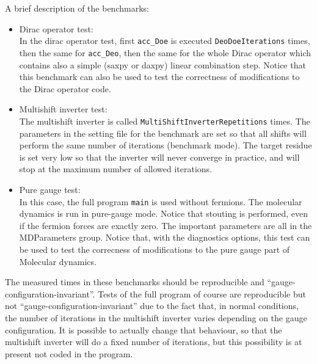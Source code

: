 A brief description of the benchmarks:
\begin{itemize}
 \item {Dirac operator test}: \\
In the dirac operator test, first \verb|acc_Doe| is executed \verb|DeoDoeIterations| 
times, then the same for \verb|acc_Deo|, then the same for the whole Dirac operator 
which contains also a simple ({\sf saxpy} or {\sf daxpy}) linear combination step.
Notice that this benchmark can also be used to test the correctness of modifications to the
Dirac operator code.
\item {Multishift inverter test}: \\
The multishift inverter is called \verb|MultiShiftInverterRepetitions| times.
The parameters in the setting file for the benchmark are set so that all shifts 
will perform the same number of iterations (benchmark mode). The target residue is set very low so that the 
inverter will never converge in practice, and will stop at the maximum number of allowed iterations.
\item {Pure gauge test}: \\
In this case, the full program \verb|main| is used without fermions. The molecular dynamics is run 
in pure-gauge mode. Notice that stouting is performed, even if the fermion forces are exactly zero.
The important parameters are all in the {\sf MDParameters} group.
Notice that, with the diagnostics options, this test can be used to test the correcness
of modifications to the pure gauge part of Molecular dynamics.
\end{itemize}

The measured times in these benchmarks should be reproducible and ``gauge-configuration-invariant''.
Tests of the full program of course are reproducible but not ``gauge-configuration-invariant'' due
to the fact that, in normal conditions, the number of iterations in the multishift inverter varies 
depending on the gauge configuration. It is possible to actually change that behaviour, so that 
the multishift inverter will do a fixed number of iterations, but this possibility is at present not coded 
in the program.